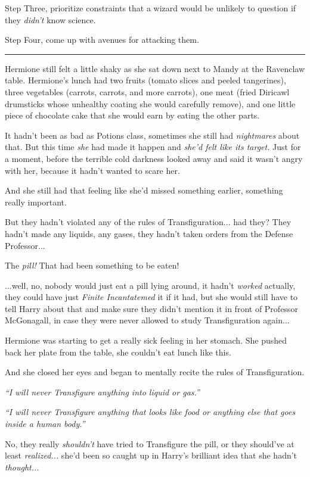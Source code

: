 Step Three, prioritize constraints that a wizard would be unlikely to question if they \emph{didn't} know science.

Step Four, come up with avenues for attacking them.

\begin{center}\rule{3in}{0.4pt}\end{center}

Hermione still felt a little shaky as she sat down next to Mandy at the Ravenclaw table. Hermione's lunch had two fruits (tomato slices and peeled tangerines), three vegetables (carrots, carrots, and more carrots), one meat (fried Diricawl drumsticks whose unhealthy coating she would carefully remove), and one little piece of chocolate cake that she would earn by eating the other parts.

It hadn't been as bad as Potions class, sometimes she still had \emph{nightmares} about that. But this time \emph{she} had made it happen and \emph{she'd felt like its target.} Just for a moment, before the terrible cold darkness looked away and said it wasn't angry with her, because it hadn't wanted to scare her.

And she still had that feeling like she'd missed something earlier, something really important.

But they hadn't violated any of the rules of Transfiguration... had they? They hadn't made any liquids, any gases, they hadn't taken orders from the Defense Professor...

The \emph{pill!} That had been something to be eaten!

...well, no, nobody would just eat a pill lying around, it hadn't \emph{worked} actually, they could have just \emph{Finite Incantatemed} it if it had, but she would still have to tell Harry about that and make sure they didn't mention it in front of Professor McGonagall, in case they were never allowed to study Transfiguration again...

Hermione was starting to get a really sick feeling in her stomach. She pushed back her plate from the table, she couldn't eat lunch like this.

And she closed her eyes and began to mentally recite the rules of Transfiguration.

\emph{``I will never Transfigure anything into liquid or gas.''}

\emph{``I will never Transfigure anything that looks like food or anything else that goes inside a human body.''}

No, they really \emph{shouldn't} have tried to Transfigure the pill, or they should've at least \emph{realized...} she'd been so caught up in Harry's brilliant idea that she hadn't \emph{thought...}


